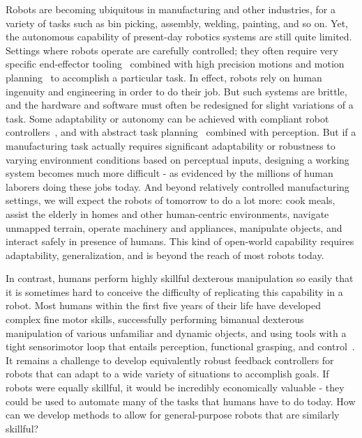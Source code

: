 Robots are becoming ubiquitous in manufacturing and other industries, for a variety of tasks such as bin picking, assembly, welding, painting, and so on.
Yet, the autonomous capability of present-day robotics systems are still quite limited.
Settings where robots operate are carefully controlled; they often require very specific end-effector tooling~\citep{wang2020soft} combined with high precision motions and motion planning~\citep{ang2005pid, lavalle2006planning, karaman2011rrtstar, zucker2013chomp} to accomplish a particular task.
In effect, robots rely on human ingenuity and engineering in order to do their job.
But such systems are brittle, and the hardware and software must often be redesigned for slight variations of a task.
Some adaptability or autonomy can be achieved with compliant robot controllers~\citep{mason1981compliance, hogan1985impedance}, and with abstract task planning~\citep{sacerdoti1974planning, Kaelbling2011} combined with perception.
But if a manufacturing task actually requires significant adaptability or robustness to varying environment conditions based on perceptual inputs, designing a working system becomes much more difficult - as evidenced by the millions of human laborers doing these jobs today.
And beyond relatively controlled manufacturing settings, we will expect the robots of tomorrow to do a lot more: cook meals, assist the elderly in homes and other human-centric environments, navigate unmapped terrain, operate machinery and appliances, manipulate objects, and interact safely in presence of humans. 
This kind of open-world capability requires adaptability, generalization, and is beyond the reach of most robots today.

In contrast, humans perform highly skillful dexterous manipulation so easily that it is sometimes hard to conceive the difficulty of replicating this capability in a robot.
Most humans within the first five years of their life have developed complex fine motor skills, successfully performing bimanual dexterous manipulation of various unfamiliar and dynamic objects, and using tools with a tight sensorimotor loop that entails perception, functional grasping, and control~\citep{adolph2017motor}.
It remains a challenge to develop equivalently robust feedback controllers for robots that can adapt to a wide variety of situations to accomplish goals.
If robots were equally skillful, it would be incredibly economically valuable - they could be used to automate many of the tasks that humans have to do today.
How can we develop methods to allow for general-purpose robots that are similarly skillful?

